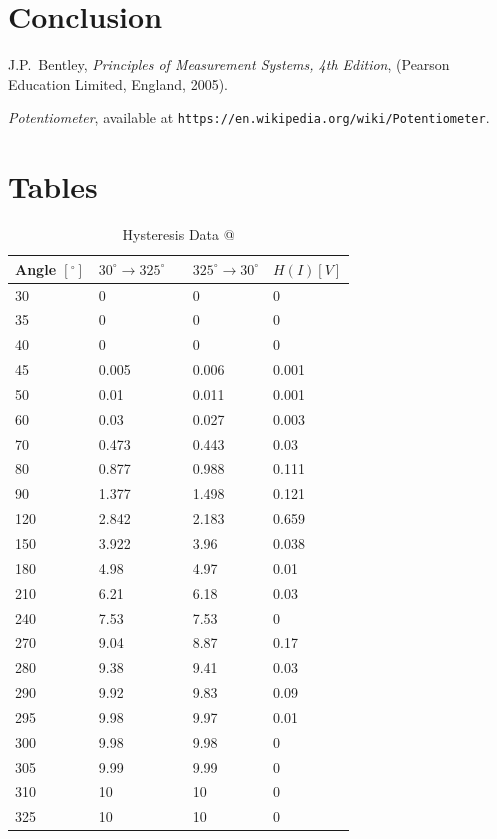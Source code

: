\documentclass[a4,11pt]{article}
\makeatletter
\newcommand*{\rom}[1]{\expandafter\@slowromancap\romannumeral #1@}
\makeatother
\begin{document}
\section{Conclusion}

\onecolumn
\begin{thebibliography}{99}
	
	J.P.\ Bentley, \textit{Principles of Measurement Systems, 4th Edition},
	(Pearson Education Limited, England, 2005).
	
	 \emph{Potentiometer},   available at
	\texttt{https://en.wikipedia.org/wiki/Potentiometer}.
	
\end{thebibliography}
\appendix
\section{Tables}
\begin{table}[H]
	\centering
	\caption{Hysteresis Data \rom{1}}
	\label{hyst1}
	\begin{tabular}{l|l|l||l}
		Angle $[^{\circ}]$  &  $30^{\circ}\rightarrow325^{\circ}$  \
		&  $325^{\circ}\rightarrow30^{\circ}$  &  $H(I) [V]$  \\
		\hline
		30  &  0  &  0  &  0  \\
		35  &  0  &  0  &  0  \\
		40  &  0  &  0  &  0  \\
		45  &  0.005  &  0.006  &  0.001  \\
		50  &  0.01  &  0.011  &  0.001  \\
		60  &  0.03  &  0.027  &  0.003  \\
		70  &  0.473  &  0.443  &  0.03  \\
		80  &  0.877  &  0.988  &  0.111  \\
		90  &  1.377  &  1.498  &  0.121  \\
		120  &  2.842  &  2.183  &  0.659  \\
		150  &  3.922  &  3.96  &  0.038  \\
		180  &  4.98  &  4.97  &  0.01  \\
		210  &  6.21  &  6.18  &  0.03  \\
		240  &  7.53  &  7.53  &  0  \\
		270  &  9.04  &  8.87  &  0.17  \\
		280  &  9.38  &  9.41  &  0.03  \\
		290  &  9.92  &  9.83  &  0.09  \\
		295  &  9.98  &  9.97  &  0.01  \\
		300  &  9.98  &  9.98  &  0  \\
		305  &  9.99  &  9.99  &  0  \\
		310  &  10  &  10  &  0  \\
		325  &  10  &  10  &  0  \\
	\end{tabular}
\end{table}
\end{document}
